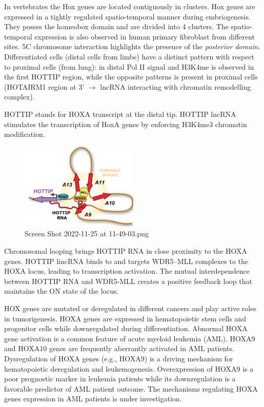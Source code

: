 In vertebrates the Hox genes are located contiguously in clusters. Hox genes are expressed in a tightly regulated spatio-temporal manner during embriogenesis. They posses the homeobox domain and are divided into 4 clusters. The spatio-temporal expression is also observed in human primary fibroblast from different sites. 5C chromosome interaction highlights the presence of the \emph{posterior domain}. Differentiated cells (distal cells from limbs) have a distinct pattern with respect to proximal cells (from lung): in distal Pol II signal and H3K4me is observed in the first HOTTIP region, while the opposite patterns is present in proximal cells (HOTAIRM1 region at 3' $\rightarrow$ lncRNA interacting with chromatin remodelling complex).

HOTTIP stands for HOXA transcript at the distal tip. HOTTIP lncRNA stimulates the transcription of HoxA genes by enforcing H3K4me3 chromatin modification.

\begin{figure}
\centering
\includegraphics[width=0.5\textwidth]{../_resources/Screen_Shot_2022-11-25_at_11-49-03.png}
\caption{Screen Shot 2022-11-25 at 11-49-03.png}
\end{figure}

Chromosomal looping brings HOTTIP RNA in close proximity to the HOXA genes. HOTTIP lincRNA binds to and targets WDR5--MLL complexes to the HOXA locus, leading to transcription activation. The mutual interdependence between HOTTIP RNA and WDR5-MLL creates a positive feedback loop that maintains the ON state of the locus.

HOX genes are mutated or deregulated in different cancers and play active roles in tumorigenesis. HOXA genes are expressed in hematopoietic stem cells and progenitor cells while downregulated during differentiation. Abnormal HOXA gene activation is a common feature of acute myeloid leukemia (AML). HOXA9 and HOXA10 genes are frequently aberrantly activated in AML patients. Dysregulation of HOXA genes (e.g., HOXA9) is a driving mechanism for hematopoietic deregulation and leukemogenesis. Overexpression of HOXA9 is a poor prognostic marker in leukemia patients while its downregulation is a favorable predictor of AML patient outcome. The mechanisms regulating HOXA genes expression in AML patients is under investigation.

